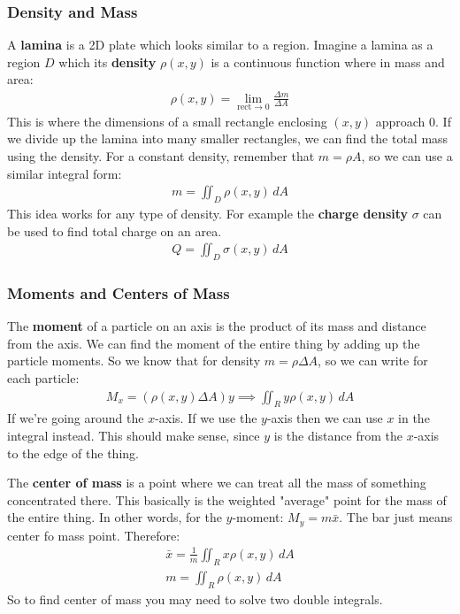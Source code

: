 \documentclass{article}
\begin{document}
\subsubsection{Density and Mass}
A \textbf{lamina} is a 2D plate which looks similar to a region. Imagine a lamina as a region $D$ which its \textbf{density} $\rho(x,y)$ is a continuous function where in mass and area:
\begin{gather*}
    \rho(x,y) = \lim_{\textrm{rect} \to 0} \frac{\Delta m}{\Delta A}
\end{gather*}
This is where the dimensions of a small rectangle enclosing $(x,y)$ approach $0$. If we divide up the lamina into many smaller rectangles, we can find the total mass using the density. For a constant density, remember that $m = \rho A$, so we can use a similar integral form:
\begin{gather*}
    m = \iint_D \rho(x,y) \, dA
\end{gather*}
This idea works for any type of density. For example the \textbf{charge density} $\sigma$ can be used to find total charge on an area.
\begin{gather*}
    Q = \iint_D \sigma(x,y)\, dA
\end{gather*}
\subsubsection{Moments and Centers of Mass}
The \textbf{moment} of a particle on an axis is the product of its mass and distance from the axis. We can find the moment of the entire thing by adding up the particle moments. So we know that for density $m = \rho \Delta A$, so we can write for each particle:
\begin{gather*}
    M_x = (\rho(x,y) \Delta A)y \implies \iint_R y\rho(x,y)\,dA
\end{gather*}
If we're going around the $x$-axis. If we use the $y$-axis then we can use $x$ in the integral instead. This should make sense, since $y$ is the distance from the $x$-axis to the edge of the thing.

The \textbf{center of mass} is a point where we can treat all the mass of something concentrated there. This basically is the weighted "average" point for the mass of the entire thing. In other words, for the $y$-moment: $M_y = m\bar{x}$. The bar just means center fo mass point. Therefore:
\begin{gather*}
    \bar{x} = \frac{1}{m}\iint_R x\rho(x,y) \, dA\\
    m = \iint_R \rho(x,y) \, dA
\end{gather*}
So to find center of mass you may need to solve two double integrals.
\end{document}
